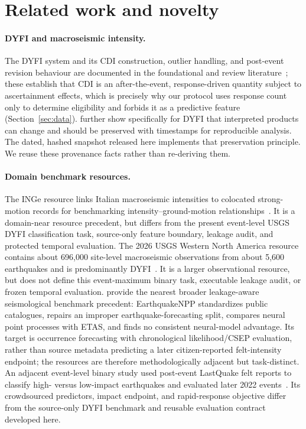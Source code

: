 \documentclass[pdflatex,sn-basic,iicol]{sn-jnl}
\begin{document}
\section{Related work and novelty}\label{sec:related}

\paragraph{DYFI and macroseismic intensity.} The DYFI system and its CDI
construction, outlier handling, and post-event revision behaviour are documented
in the foundational and review literature~\citep{wald1999dyfi,atkinson2007dyfi,
wald2012dyfi,quitoriano2020dyfi}; these establish that CDI is an
after-the-event, response-driven quantity subject to ascertainment effects,
which is precisely why our protocol uses response count only to determine
eligibility and forbids it as a predictive feature (Section~\ref{sec:data}).
\citet{rosler2022documentation} further show specifically for DYFI that
interpreted products can change and should be preserved with timestamps for
reproducible analysis. The dated, hashed snapshot released here implements that
preservation principle. We reuse these provenance facts rather than re-deriving
them.

\paragraph{Domain benchmark resources.} The INGe resource links Italian
macroseismic intensities to colocated strong-motion records for benchmarking
intensity--ground-motion relationships~\citep{oliveti2022inge}. It is a
domain-near resource precedent, but differs from the present event-level USGS
DYFI classification task, source-only feature boundary, leakage audit, and
protected temporal evaluation.
The 2026 USGS Western North America resource contains about 696{,}000
site-level macroseismic observations from about 5{,}600 earthquakes and is
predominantly DYFI~\citep{fathiansabet2026western}. It is a larger observational
resource, but does not define this event-maximum binary task, executable leakage
audit, or frozen temporal evaluation.
\citet{stockman2026earthquakenpp} provide the nearest broader
leakage-aware seismological benchmark precedent: EarthquakeNPP standardizes
public catalogues, repairs an improper earthquake-forecasting split, compares
neural point processes with ETAS, and finds no consistent neural-model
advantage. Its target is occurrence forecasting with chronological
likelihood/CSEP evaluation, rather than source metadata predicting a later
citizen-reported felt-intensity endpoint; the resources are therefore
methodologically adjacent but task-distinct.
An adjacent event-level binary study used post-event LastQuake felt reports to
classify high- versus low-impact earthquakes and evaluated later 2022
events~\citep{lilienkamp2023feltreports}. Its crowdsourced predictors,
impact endpoint, and rapid-response objective differ from the source-only DYFI
benchmark and reusable evaluation contract developed here.
\end{document}
